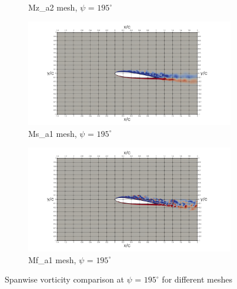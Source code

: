 \begin{figure}[H]
\begin{subfigure}[b]{0.475\textwidth}
\caption{Mz\_a2 mesh, $\psi$ = $195^\circ$}
\label{fig:Ma2_psi195}
\end{subfigure}
\begin{subfigure}[b]{0.475\textwidth}
\centering
\includegraphics[width=1.25\textwidth]{figures/vorticity_plots/SB/ph_195.png}
\caption{Ms\_a1 mesh, $\psi$ = $195^\circ$}
\label{fig:hadapt_psi195}
\end{subfigure}

\begin{subfigure}[b]{0.475\textwidth}
\centering
\includegraphics[width=1.25\textwidth]{figures/vorticity_plots/FB/ph_195.png}
\caption{Mf\_a1 mesh, $\psi$ = $195^\circ$}
\label{fig:FB_psi195}
\end{subfigure}
\caption{Spanwise vorticity comparison at $\psi$ = $195^\circ$ for different meshes}
\label{fig:vorticity_195}
\end{figure}



